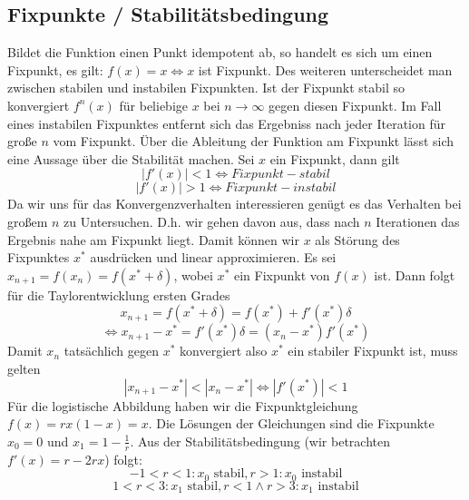 \documentclass[12pt,a4paper]{article}
\begin{document}
\subsection{Fixpunkte / Stabilitätsbedingung}
Bildet die Funktion einen Punkt idempotent ab, so handelt es sich um einen Fixpunkt, es gilt: $f(x)=x \iff x$ ist Fixpunkt. Des weiteren unterscheidet man zwischen stabilen und instabilen Fixpunkten. Ist der Fixpunkt stabil so konvergiert $f^n(x)$ für beliebige $x$ bei $n \rightarrow \infty$ gegen diesen Fixpunkt. Im Fall eines instabilen Fixpunktes entfernt sich das Ergebniss nach jeder Iteration für große $n$ vom Fixpunkt.
\newline
Über die Ableitung der Funktion am Fixpunkt lässt sich eine Aussage über die Stabilität machen. Sei $x$ ein Fixpunkt, dann gilt
\begin{equation} |f'(x)|<1 \iff Fixpunkt-stabil \end{equation}
\begin{equation} |f'(x)|>1 \iff Fixpunkt-instabil \end{equation}
Da wir uns für das Konvergenzverhalten interessieren genügt es das Verhalten bei großem $n$ zu Untersuchen. D.h. wir gehen davon aus, dass nach $n$ Iterationen das Ergebnis nahe am Fixpunkt liegt. Damit können wir $x$ als Störung des Fixpunktes $x^*$ ausdrücken und linear approximieren. Es sei $x_{n+1} = f(x_n)=f(x^*+\delta)$, wobei $x^*$ ein Fixpunkt von $f(x)$ ist. Dann folgt für die Taylorentwicklung ersten Grades
\begin{equation}
x_{n+1} = f(x^*+\delta)=f(x^*)+f'(x^*)\delta
\end{equation}
\begin{equation}
\Leftrightarrow x_{n+1} - x^* = f'(x^*)\delta = (x_n - x^*)f'(x^*)
\end{equation}
Damit $x_n$ tatsächlich gegen $x^*$ konvergiert also $x^*$ ein stabiler Fixpunkt ist, muss gelten
\begin{equation}
|x_{n+1}-x^*| < |x_n-x^*| \Leftrightarrow |f'(x^*)|<1
\end{equation}
Für die logistische Abbildung haben wir die Fixpunktgleichung$ f(x)=rx(1-x)=x $. Die Lösungen der Gleichungen sind die Fixpunkte $x_{0}=0$ und $x_{1}=1-\frac{1}{r}$. Aus der Stabilitätsbedingung (wir betrachten $f'(x)=r-2rx$) folgt:
\begin{equation}
-1 < r < 1: x_{0} \text{ stabil}, r > 1: x_{0} \text{ instabil}
\end{equation}
\begin{equation}
1 < r < 3: x_1 \text{ stabil}, r<1 \wedge  r> 3: x_1 \text{ instabil}
\end{equation}
\end{document}
